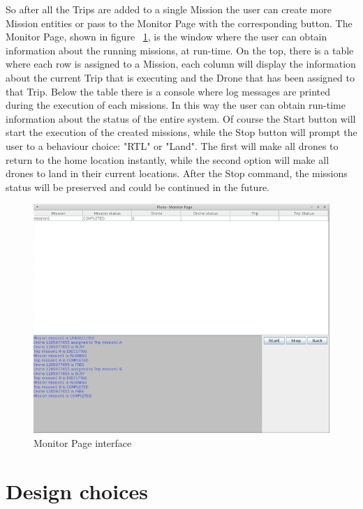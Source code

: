 So after all the Trips are added to a single Mission the user can create more Mission entities  or pass to the Monitor Page with the corresponding button.
The Monitor Page, shown in figure ~\ref{fig:MonitorPage}, is the window where the user can obtain information about the running missions, at run-time. On the top, there is a table where each row is assigned to a Mission, each column will display the information about the current Trip that is executing and the Drone that has been assigned to that Trip.
Below the table there is a console where log messages are printed during the execution of each missions. In this way the user can obtain run-time information about the status of the entire system. 
Of course the Start button will start the execution of the created missions, while the Stop button will prompt the user to a behaviour choice: "RTL" or "Land". The first will make all drones to return to the home location instantly, while the second option will make all drones to land in their current locations. After the Stop command, the missions status will be preserved and could be continued in the future.

\begin{figure}[H]
  \centering
  \includegraphics[width=\linewidth]{pictures/MonitorPage.png}
  \caption{Monitor Page interface}
  \label{fig:MonitorPage}
\end{figure}

\section{Design choices}\label{history}

